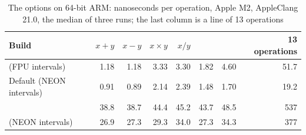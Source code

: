 \documentclass[12pt,a4paper,twoside,openright]{book}
\begin{document}
\begin{table}[htbp]
  \centering\renewcommand{\arraystretch}{1.1}\footnotesize
  \begin{tabular}{L{4.6cm}rrrrrrr}
    \hline
    Build & $x + y$ & $x - y$ & $x \times y$ & $x / y$ &  &
     & 13 operations\\
    \hline\hline
     (FPU intervals) & 1.18 & 1.18 & 3.33 & 3.30 &
    1.82 & 4.60 & 51.7\\
    Default (NEON intervals) & 0.91 & 0.89 & 2.14 & 2.39 & 1.48 & 1.70 &
    19.2\\
      & 38.8 &
    38.7 & 44.4 & 45.2 & 43.7 & 48.5 & 537\\
     (NEON intervals) & 26.9 & 27.3 &
    29.3 & 34.0 & 27.3 & 34.3 & 377\\
    \hline
  \end{tabular}
  \caption[The options on 64-bit ARM (Apple M2, AppleClang 21.0)]{The options on 64-bit ARM: nanoseconds per operation, Apple M2,
    AppleClang 21.0, the median of three runs; the last column is a line of
    13 operations}
  \label{tab:install-worth-arm}
\end{table}
\end{document}
